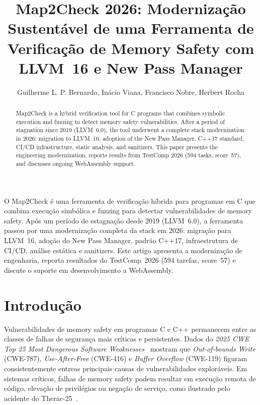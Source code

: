 \documentclass[12pt]{article}
\title{Map2Check 2026: Modernização Sustentável de uma Ferramenta de Verificação de Memory Safety com LLVM~16 e New Pass Manager}
\author{Guilherme L. P. Bernardo\inst{1}, Inácio Viana\inst{1}, Francisco Nobre\inst{2}, Herbert Rocha\inst{1}}
\newcommand{\TotalTasks}{594}
\newcommand{\ScoreTestComp}{57}
\newcommand{\LLVMVersion}{16}
\newcommand{\CppStandard}{C++17}
\begin{document}
\maketitle

\begin{abstract}
  Map2Check is a hybrid verification tool for C programs that combines symbolic
  execution and fuzzing to detect memory safety vulnerabilities. After a period
  of stagnation since 2019 (LLVM~6.0), the tool underwent a complete stack
  modernization in 2026: migration to LLVM~\LLVMVersion, adoption of the New Pass Manager,
  \CppStandard{} standard, CI/CD infrastructure, static analysis, and sanitizers. This
  paper presents the engineering modernization, reports results from TestComp
  2026 (\TotalTasks{} tasks, score~\ScoreTestComp), and discusses ongoing WebAssembly support.
\end{abstract}

\begin{resumo}
  O Map2Check é uma ferramenta de verificação híbrida para programas em C que combina execução simbólica e fuzzing para detectar vulnerabilidades de memory safety. Após um período de estagnação desde 2019 (LLVM~6.0), a ferramenta passou por uma modernização completa da stack em 2026: migração
  para LLVM~\LLVMVersion, adoção do New Pass Manager, padrão \CppStandard, infraestrutura de CI/CD, análise estática e sanitizers. Este artigo apresenta a modernização de engenharia, reporta resultados do TestComp~2026 (\TotalTasks{} tarefas, score~\ScoreTestComp) e discute o suporte em desenvolvimento a WebAssembly.
\end{resumo}


\section{Introdução}
\label{sec:intro}

Vulnerabilidades de memory safety em programas C e C++ permanecem entre as classes de falhas de segurança mais críticas e persistentes. Dados do \textit{2025 CWE Top 25 Most Dangerous Software Weaknesses}~\cite{cwe2025} mostram que \textit{Out-of-bounds Write} (CWE-787), \textit{Use-After-Free} (CWE-416) e \textit{Buffer Overflow} (CWE-119) figuram consistentemente entreas principais causas de vulnerabilidades exploráveis. Em sistemas críticos, falhas de memory safety podem resultar em execução remota de código, elevação de privilégios ou negação de serviço, como ilustrado pelo acidente do
Therac-25~\cite{leveson1993investigation}.
\end{document}
